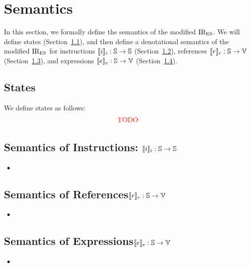 \section{Semantics}\label{sec:semantics}
In this section, we formally define the semantics of the modified ${\text{IR}_\text{ES}}$.  We
will define states (Section~\ref{sec:state}), and then define a denotational
semantics of the modified ${\text{IR}_\text{ES}}$ for instructions $\llbracket{i}\rrbracket_i: \mathbb{S}
\rightarrow \mathbb{S}$ (Section~\ref{sec:semi}), references $\llbracket{r}\rrbracket_r: \mathbb{S}
\rightarrow \mathbb{V}$ (Section~\ref{sec:semr}), and expressions $\llbracket{e}\rrbracket_e:
\mathbb{S} \rightarrow \mathbb{V}$ (Section~\ref{sec:seme}).


\subsection{States}\label{sec:state}
We define states as follows:
\[
  \vspace*{-1em}
  \begin{array}{l@{~}r@{~}c@{~}r@{~}r@{~}l}
    \todo
  \end{array}
  \vspace*{1em}
\]

\subsection{Semantics of Instructions: $\llbracket{i}\rrbracket_i: \mathbb{S} \rightarrow
\mathbb{S}$}\label{sec:semi}
\begin{itemize}
  \item \todo
\end{itemize}


\subsection{Semantics of References$\llbracket{r}\rrbracket_r: \mathbb{S} \rightarrow
\mathbb{V}$}\label{sec:semr}
\begin{itemize}
  \item \todo
\end{itemize}


\subsection{Semantics of Expressions$\llbracket{e}\rrbracket_e: \mathbb{S} \rightarrow
\mathbb{V}$}\label{sec:seme}
\begin{itemize}
  \item \todo
\end{itemize}

